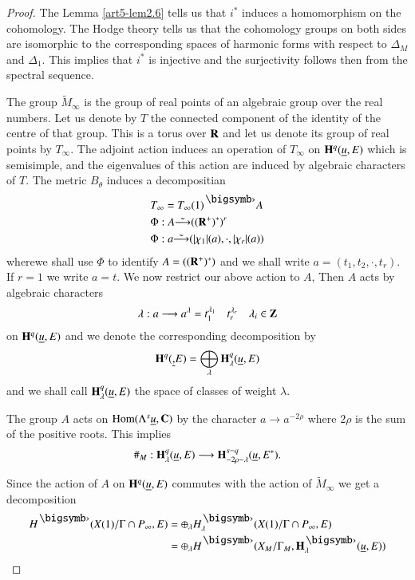\begin{proof}
The Lemma \ref{art5-lem2.6} tells us that $i^\ast$ induces a homomorphism on the cohomology. The Hodge theory tells us that the cohomology groups on both sides are isomorphic to the corresponding spaces of harmonic forms with respect to $\Delta_M$ and $\Delta_1$. This implies that $i^\ast$ is injective and the surjectivity  follows then from the spectral sequence.

The group $\tilde{M}_\infty$ is the group of real points of an algebraic group over the real numbers. Let us denote by $T$ the connected component of the identity of the centre of that group.  This is a torus over $\mathbf{R}$ and let us denote its group of real points by $T_\infty$. The adjoint action induces an operation of $T_\infty$ on $\mathbf{H}^q (\underline{u}, E)$ which is semisimple, and the eigenvalues of this action are induced by algebraic characters of $T$. The metric $B_\theta$ induces a decompositian
\begin{align}
& T_\infty = T_\infty (1)^\bigdot A \notag\\
& \Phi : A \tilde{\longrightarrow} ((\bR^+)^\ast)^r \notag\\
&  \Phi : a \tilde{\longrightarrow} (|\chi_1| (a), \cdot, |\chi_r| (a)) 
\label{art5-eq2.9}
\end{align}
where\pageoriginale we shall use $\Phi$ to identify $A = ((\mathbf{R}^+)^\ast)$ and we shall write $a = (t_1, t_2 , \cdot , t_r)$. If $r =1$ we write $a =t$. We now restrict our above action to $A$, Then $A$ acts  by algebraic characters
$$
\lambda: a \longrightarrow a^\lambda = t_1^{\lambda_1} \quad t^{\lambda_r}_{r} \quad \lambda_i \in \mathbf{Z}
$$
on $\mathbf{H}^q (\underline{u}, E)$ and we denote the corresponding decomposition by 
\begin{equation}
\mathbf{H}^q (\underline, E) = \bigoplus\limits_\lambda \mathbf{H}^q_\lambda (\underline{u}, E) 
\label{art5-eq2.10}
\end{equation}
 and we shall call $\mathbf{H}^q_\lambda (\underline{u}, E)$ the space of classes of weight $\lambda$.

The group $A$ acts on $\operatorname{Hom} (\Lambda^s\underline{u}, \mathbf{C})$ by the character $a \to a^{-2\rho}$ where $2\rho$ is the sum of the positive roots. This implies 
$$
\#_M : \mathbf{H}^q_\lambda (\underline{u}, E) \longrightarrow \mathbf{H}^{s-q}_{-2\rho -\lambda} (\underline{u}, E^\ast).
$$

Since the action of $A$ on $\mathbf{H}^q (\underline{u}, E)$ commutes with the action of $\tilde{M}_\infty$ we get a decomposition
\begin{align*}
H^\bigdot (X (1)/ \Gamma \cap P_\infty, E) & = \oplus_\lambda H^\bigdot_\lambda (X (1) / \Gamma \cap P_\infty, E)\\
& = \oplus_\lambda H^\bigdot (X_M / \Gamma_M, \bH^\bigdot_\lambda (\underline{u}, E))
\end{align*}
\end{proof}

